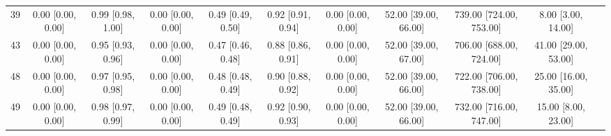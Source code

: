 \documentclass[8pt]{article}
\begin{document}
\begin{center}
\begin{footnotesize}
\begin{longtable}{|ccccccccccc|}
 39 &  0.00 [0.00, 0.00] &  0.99 [0.98, 1.00] &  0.00 [0.00, 0.00] &  0.49 [0.49, 0.50] &  0.92 [0.91, 0.94] &     0.00 [0.00, 0.00] &  52.00 [39.00, 66.00] &  739.00 [724.00, 753.00] &       8.00 [3.00, 14.00] \\
 43 &  0.00 [0.00, 0.00] &  0.95 [0.93, 0.96] &  0.00 [0.00, 0.00] &  0.47 [0.46, 0.48] &  0.88 [0.86, 0.91] &     0.00 [0.00, 0.00] &  52.00 [39.00, 67.00] &  706.00 [688.00, 724.00] &     41.00 [29.00, 53.00] \\
 48 &  0.00 [0.00, 0.00] &  0.97 [0.95, 0.98] &  0.00 [0.00, 0.00] &  0.48 [0.48, 0.49] &  0.90 [0.88, 0.92] &     0.00 [0.00, 0.00] &  52.00 [39.00, 66.00] &  722.00 [706.00, 738.00] &     25.00 [16.00, 35.00] \\
 49 &  0.00 [0.00, 0.00] &  0.98 [0.97, 0.99] &  0.00 [0.00, 0.00] &  0.49 [0.48, 0.49] &  0.92 [0.90, 0.93] &     0.00 [0.00, 0.00] &  52.00 [39.00, 66.00] &  732.00 [716.00, 747.00] &      15.00 [8.00, 23.00] \\
\end{longtable}
\end{footnotesize}
\end{center}
\end{document}
